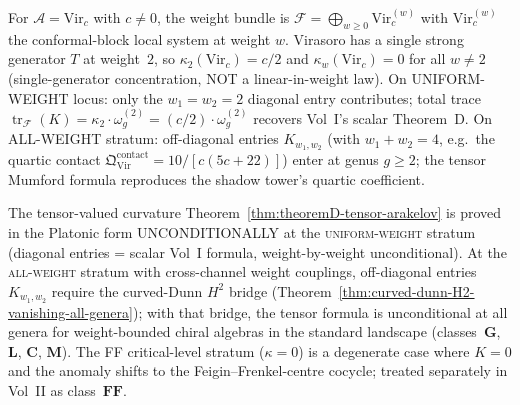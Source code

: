 \documentclass[11pt]{article}
\begin{document}
\begin{example}[Virasoro: diagonal tensor curvature for
  UNIFORM-WEIGHT = scalar]
\label{ex:theoremD-virasoro}
For $\mathcal{A} = \mathrm{Vir}_c$ with $c \neq 0$, the weight
bundle is $\mathcal{F} = \bigoplus_{w \ge 0} \mathrm{Vir}_c^{(w)}$
with $\mathrm{Vir}_c^{(w)}$ the conformal-block local system at
weight $w$. Virasoro has a single strong generator $T$ at
weight~$2$, so $\kappa_2(\mathrm{Vir}_c) = c/2$ and
$\kappa_w(\mathrm{Vir}_c) = 0$ for all $w \neq 2$ (single-generator
concentration, NOT a linear-in-weight law).
On UNIFORM-WEIGHT locus: only the $w_1 = w_2 = 2$ diagonal entry
contributes; total trace
$\operatorname{tr}_\mathcal{F}(K) = \kappa_2 \cdot \omega_g^{(2)} =
(c/2) \cdot \omega_g^{(2)}$ recovers Vol~I's scalar Theorem~D. On ALL-WEIGHT stratum: off-diagonal
entries $K_{w_1, w_2}$ (with $w_1 + w_2 = 4$, e.g.\ the quartic
contact $\mathfrak{Q}^{\mathrm{contact}}_{\mathrm{Vir}} =
10/[c(5c+22)]$) enter at genus $g \ge 2$; the tensor Mumford
formula reproduces the shadow tower's quartic coefficient.
\end{example}

\begin{remark}
\label{rem:theoremD-tensor-scope}
The tensor-valued curvature
Theorem~\ref{thm:theoremD-tensor-arakelov} is proved in the
Platonic form UNCONDITIONALLY at the \textsc{uniform-weight}
stratum (diagonal entries = scalar Vol~I formula, weight-by-weight
unconditional). At the \textsc{all-weight} stratum with
cross-channel weight couplings, off-diagonal entries
$K_{w_1, w_2}$ require the curved-Dunn $H^2$ bridge
(Theorem~\ref{thm:curved-dunn-H2-vanishing-all-genera}); with that
bridge, the tensor formula is unconditional at all genera for
weight-bounded chiral algebras in the standard landscape
(classes~$\mathbf{G}$, $\mathbf{L}$, $\mathbf{C}$, $\mathbf{M}$).
The FF critical-level stratum ($\kappa = 0$) is a degenerate case
where $K = 0$ and the anomaly shifts to the Feigin--Frenkel-centre
cocycle; treated separately in Vol~II as class~$\mathbf{FF}$.
\end{remark}
\end{document}
